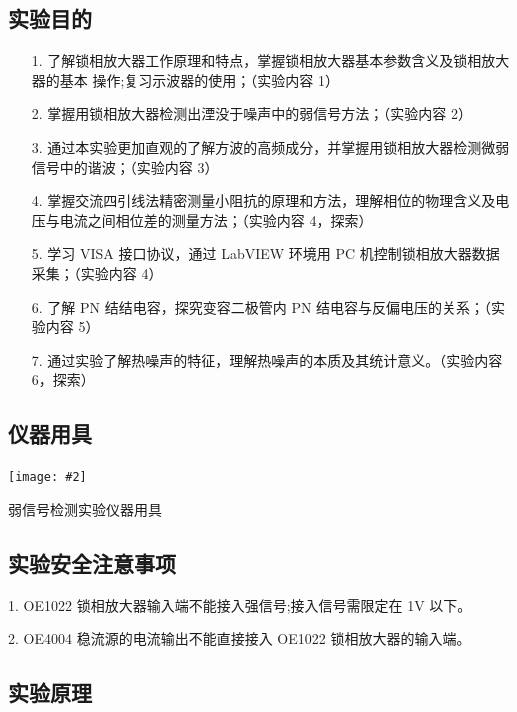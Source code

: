 \documentclass[11pt,a4paper]{ctexart}
\newcommand{\cpic}[2]{
\begin{center}
\texttt{[image: \#2]}
\end{center}
}
\begin{document}
\subsection{实验目的}
\begin{enumerate}
 \item[1.]了解锁相放大器工作原理和特点，掌握锁相放大器基本参数含义及锁相放大器的基本 操作;复习示波器的使用；（实验内容 1）
  \item[2.]掌握用锁相放大器检测出湮没于噪声中的弱信号方法；（实验内容 2）
  \item[3.]通过本实验更加直观的了解方波的高频成分，并掌握用锁相放大器检测微弱信号中的谐波；（实验内容 3）
\item[4.]掌握交流四引线法精密测量小阻抗的原理和方法，理解相位的物理含义及电压与电流之间相位差的测量方法；（实验内容 4，探索）
\item[5.] 学习 VISA 接口协议，通过 LabVIEW 环境用 PC 机控制锁相放大器数据采集；（实验内容 4）
\item[6.]了解 PN 结结电容，探究变容二极管内 PN 结电容与反偏电压的关系；（实验内容 5）
\item[7.] 通过实验了解热噪声的特征，理解热噪声的本质及其统计意义。（实验内容 6，探索）
\end{enumerate}


\subsection{仪器用具}
\begin{table}[H]
\cpic{0.4}{t1}
\caption{弱信号检测实验仪器用具}
\end{table}

\subsection{实验安全注意事项}

1. OE1022 锁相放大器输入端不能接入强信号;接入信号需限定在 1V 以下。

2. OE4004 稳流源的电流输出不能直接接入 OE1022 锁相放大器的输入端。

\subsection{实验原理}
\end{document}
